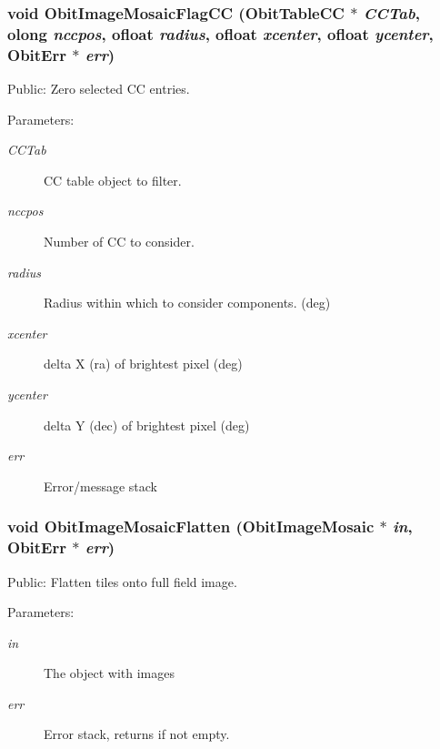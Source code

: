 \subsubsection{\setlength{\rightskip}{0pt plus 5cm}void Obit\-Image\-Mosaic\-Flag\-CC ({\bf Obit\-Table\-CC} $\ast$ {\em CCTab}, {\bf olong} {\em nccpos}, {\bf ofloat} {\em radius}, {\bf ofloat} {\em xcenter}, {\bf ofloat} {\em ycenter}, {\bf Obit\-Err} $\ast$ {\em err})}\label{ObitImageMosaic_8c_a29}


Public: Zero selected CC entries. 

\begin{Desc}
\item[Parameters:]
\begin{description}
\item[{\em CCTab}]CC table object to filter. \item[{\em nccpos}]Number of CC to consider. \item[{\em radius}]Radius within which to consider components. (deg) \item[{\em xcenter}]delta X (ra) of brightest pixel (deg) \item[{\em ycenter}]delta Y (dec) of brightest pixel (deg) \item[{\em err}]Error/message stack \end{description}
\end{Desc}
\subsubsection{\setlength{\rightskip}{0pt plus 5cm}void Obit\-Image\-Mosaic\-Flatten ({\bf Obit\-Image\-Mosaic} $\ast$ {\em in}, {\bf Obit\-Err} $\ast$ {\em err})}\label{ObitImageMosaic_8c_a25}


Public: Flatten tiles onto full field image. 

\begin{Desc}
\item[Parameters:]
\begin{description}
\item[{\em in}]The object with images \item[{\em err}]Error stack, returns if not empty. \end{description}
\end{Desc}
